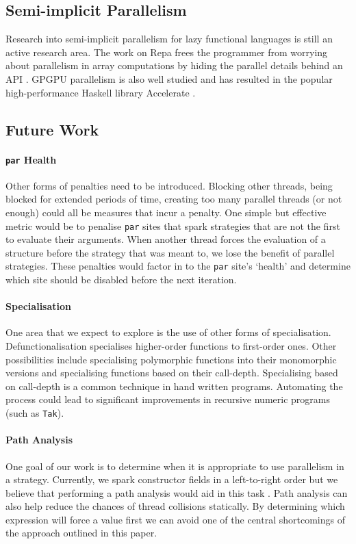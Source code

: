 \subsection*{Semi-implicit Parallelism}
Research into semi-implicit parallelism for lazy functional languages is still
an active research area. The work on Repa frees the programmer from worrying
about parallelism in array computations by hiding the parallel details behind an
API \citep{repa}. GPGPU parallelism is also well studied and has resulted in the
popular high-performance Haskell library Accelerate \citep{accelerate}.

\subsection{Future Work}

\paragraph{\texttt{par} Health} Other forms of penalties need to be introduced.
Blocking other threads, being blocked for extended periods of time, creating
too many parallel threads (or not enough) could all be measures that incur a
penalty. One simple but effective metric would be to penalise \verb-par- sites
that spark strategies that are not the first to evaluate their arguments. When
another thread forces the evaluation of a structure before the strategy that
was meant to, we lose the benefit of parallel strategies. These penalties would
factor in to the \verb-par- site's `health' and determine which site should be
disabled before the next iteration.

\paragraph{Specialisation}

One area that we expect to explore is the use of other forms of specialisation.
Defunctionalisation specialises higher-order functions to first-order ones.
Other possibilities include specialising polymorphic functions into their
monomorphic versions and specialising functions based on their call-depth.
Specialising based on call-depth is a common technique in hand written programs.
Automating the process could lead to significant improvements in recursive
numeric programs (such as \texttt{Tak}).

\paragraph{Path Analysis} One goal of our work is to determine when it is
appropriate to use parallelism in a strategy.  Currently, we spark constructor
fields in a left-to-right order but we believe that performing a path analysis
would aid in this task \citep{bloss1994path}. Path analysis can also help reduce
the chances of thread collisions statically. By determining which expression
will force a value first we can avoid one of the central shortcomings of the
approach outlined in this paper.
